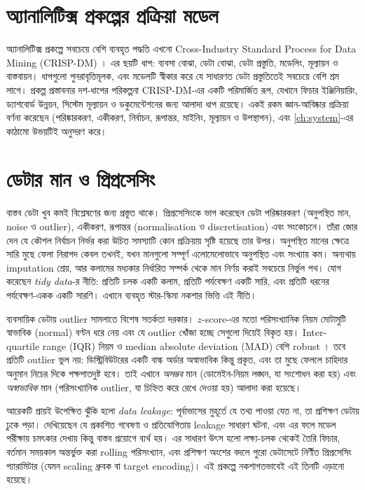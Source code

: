 \section{অ্যানালিটিক্স প্রকল্পের প্রক্রিয়া মডেল}
অ্যানালিটিক্স প্রকল্পে সবচেয়ে বেশি ব্যবহৃত পদ্ধতি এখনো Cross-Industry Standard Process for Data Mining (CRISP-DM)
\citep{shearer2000}। এর ছয়টি ধাপ: ব্যবসা বোঝা, ডেটা বোঝা, ডেটা প্রস্তুতি, মডেলিং, মূল্যায়ন ও বাস্তবায়ন। ধাপগুলো পুনরাবৃত্তিমূলক,
এবং মডেলটি স্বীকার করে যে সাধারণত ডেটা প্রস্তুতিতেই সবচেয়ে বেশি শ্রম লাগে। প্রকল্প প্রস্তাবনার দশ-ধাপের পরিকল্পনা CRISP-DM-এর
একটি পরিমার্জিত রূপ, যেখানে ফিচার ইঞ্জিনিয়ারিং, ড্যাশবোর্ড উন্নয়ন, সিস্টেম মূল্যায়ন ও ডকুমেন্টেশনের জন্য আলাদা ধাপ রয়েছে।
\citet{han2012} একই রকম জ্ঞান-আবিষ্কার প্রক্রিয়া বর্ণনা করেছেন (পরিষ্কারকরণ, একীকরণ, নির্বাচন, রূপান্তর, মাইনিং, মূল্যায়ন ও
উপস্থাপন), এবং \cref{ch:system}-এর কাঠামো উভয়টিই অনুসরণ করে।

\section{ডেটার মান ও প্রিপ্রসেসিং}
বাস্তব ডেটা খুব কমই বিশ্লেষণের জন্য প্রস্তুত থাকে। \citet{garcia2015} প্রিপ্রসেসিংকে ভাগ করেছেন ডেটা পরিষ্কারকরণ (অনুপস্থিত মান,
noise ও outlier), একীকরণ, রূপান্তর (normalisation ও discretisation) এবং সংকোচনে। তাঁরা জোর দেন যে কৌশল নির্বাচন নির্ভর
করা উচিত সমস্যাটি কোন প্রক্রিয়ায় সৃষ্টি হয়েছে তার উপর। অনুপস্থিত মানের ক্ষেত্রে সারি মুছে ফেলা নিরাপদ কেবল তখনই, যখন মানগুলো
সম্পূর্ণ এলোমেলোভাবে অনুপস্থিত এবং সংখ্যায় কম। অন্যথায় imputation শ্রেয়, আর কলামের মধ্যকার নির্ধারিত সম্পর্ক থেকে মান
নির্ণয় করাই সবচেয়ে নির্ভুল পথ। \citet{wickham2014} যোগ করেছেন \emph{tidy data}-র নীতি: প্রতিটি চলক একটি কলাম, প্রতিটি
পর্যবেক্ষণ একটি সারি, এবং প্রতিটি ধরনের পর্যবেক্ষণ-একক একটি সারণি। এখানে ব্যবহৃত স্টার-স্কিমা নকশার ভিত্তি এই নীতি।

ব্যবসায়িক ডেটায় outlier সামলাতে বিশেষ সতর্কতা দরকার। $z$-score-এর মতো পরিসংখ্যানিক নিয়ম মোটামুটি স্বাভাবিক (normal) বণ্টন ধরে
নেয় এবং যে outlier খোঁজা হচ্ছে সেগুলো দিয়েই বিকৃত হয়। Inter-quartile range (IQR) নিয়ম ও median absolute deviation (MAD)
বেশি robust \citep{han2012}। তবে প্রতিটি outlier ভুল নয়: ডিস্ট্রিবিউটরের একটি বাল্ক অর্ডার অস্বাভাবিক কিন্তু প্রকৃত, এবং তা মুছে
ফেললে চাহিদার অনুমান নিচের দিকে পক্ষপাতদুষ্ট হবে। তাই এখানে \emph{অসম্ভব} মান (ডোমেইন-নিয়ম লঙ্ঘন, যা সংশোধন করা হয়) এবং
\emph{অস্বাভাবিক} মান (পরিসংখ্যানিক outlier, যা চিহ্নিত করে রেখে দেওয়া হয়) আলাদা করা হয়েছে।

আরেকটি প্রায়ই উপেক্ষিত ঝুঁকি হলো \emph{data leakage}: পূর্বাভাসের মুহূর্তে যে তথ্য পাওয়া যেত না, তা প্রশিক্ষণ ডেটায় ঢুকে পড়া।
\citet{kaufman2012} দেখিয়েছেন যে প্রকাশিত গবেষণা ও প্রতিযোগিতায় leakage সাধারণ ঘটনা, এবং এর ফলে মডেল পরীক্ষায় চমৎকার দেখায়
কিন্তু বাস্তব প্রয়োগে ব্যর্থ হয়। এর সাধারণ উৎস হলো লক্ষ্য-চলক থেকেই তৈরি ফিচার, বর্তমান সময়কাল অন্তর্ভুক্ত করা rolling পরিসংখ্যান,
এবং প্রশিক্ষণ অংশের বদলে পুরো ডেটাসেটে নির্ণীত প্রিপ্রসেসিং প্যারামিটার (যেমন scaling ধ্রুবক বা target encoding)। এই প্রকল্পে
নকশাগতভাবেই এই তিনটি এড়ানো হয়েছে।

